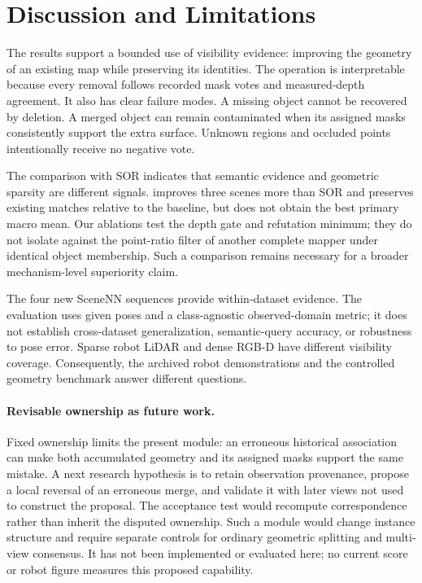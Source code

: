 \section{Discussion and Limitations}
The results support a bounded use of visibility evidence: improving the geometry of an existing map while preserving its identities. The operation is interpretable because every removal follows recorded mask votes and measured-depth agreement. It also has clear failure modes. A missing object cannot be recovered by deletion. A merged object can remain contaminated when its assigned masks consistently support the extra surface. Unknown regions and occluded points intentionally receive no negative vote.

The comparison with SOR indicates that semantic evidence and geometric sparsity are different signals. \ours{} improves three scenes more than SOR and preserves existing matches relative to the baseline, but does not obtain the best primary macro mean. Our ablations test the depth gate and refutation minimum; they do not isolate \ours{} against the point-ratio filter of another complete mapper under identical object membership. Such a comparison remains necessary for a broader mechanism-level superiority claim.

The four new SceneNN sequences provide within-dataset evidence. The evaluation uses given poses and a class-agnostic observed-domain metric; it does not establish cross-dataset generalization, semantic-query accuracy, or robustness to pose error. Sparse robot LiDAR and dense RGB-D have different visibility coverage. Consequently, the archived robot demonstrations and the controlled geometry benchmark answer different questions.

\paragraph{Revisable ownership as future work.} Fixed ownership limits the present module: an erroneous historical association can make both accumulated geometry and its assigned masks support the same mistake. A next research hypothesis is to retain observation provenance, propose a local reversal of an erroneous merge, and validate it with later views not used to construct the proposal. The acceptance test would recompute correspondence rather than inherit the disputed ownership. Such a module would change instance structure and require separate controls for ordinary geometric splitting and multi-view consensus. It has not been implemented or evaluated here; no current score or robot figure measures this proposed capability.

